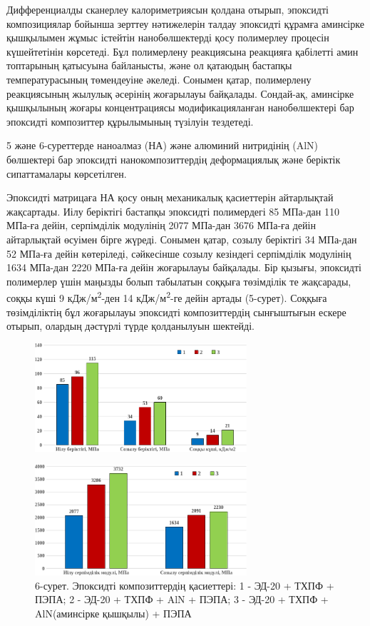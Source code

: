 \begin{multicols}{2}
Дифференциалды сканерлеу калориметриясын қолдана отырып, эпоксидті
композициялар бойынша зерттеу нәтижелерін талдау эпоксидті құрамға
аминсірке қышқылымен жұмыс істейтін нанобөлшектерді қосу полимерлеу
процесін күшейтетінін көрсетеді. Бұл полимерлену реакциясына реакцияға
қабілетті амин топтарының қатысуына байланысты, және ол қатаюдың
бастапқы температурасының төмендеуіне әкеледі. Сонымен қатар,
полимерлену реакциясының жылулық әсерінің жоғарылауы байқалады.
Сондай-ақ, аминсірке қышқылының жоғары концентрациясы модификацияланған
нанобөлшектері бар эпоксидті композиттер құрылымының түзілуін тездетеді.

5 және 6-суреттерде наноалмаз (НА) және алюминий нитридінің (AlN)
бөлшектері бар эпоксидті нанокомпозиттердің деформациялық және беріктік
сипаттамалары көрсетілген.

Эпоксидті матрицаға НА қосу оның механикалық қасиеттерін айтарлықтай
жақсартады. Иілу беріктігі бастапқы эпоксидті полимердегі 85 МПа-дан 110
МПа-ға дейін, серпімділік модулінің 2077 МПа-дан 3676 МПа-ға дейін
айтарлықтай өсуімен бірге жүреді. Сонымен қатар, созылу беріктігі 34
МПа-дан 52 МПа-ға дейін көтеріледі, сәйкесінше созылу кезіндегі
серпімділік модулінің 1634 МПа-дан 2220 МПа-ға дейін жоғарылауы
байқалады. Бір қызығы, эпоксидті полимерлер үшін маңызды болып табылатын
соққыға төзімділік те жақсарады, соққы күші 9
кДж/м\textsuperscript{2}-ден 14 кДж/м\textsuperscript{2}-ге дейін артады
(5-сурет). Соққыға төзімділіктің бұл жоғарылауы эпоксидті композиттердің
сынғыштығын ескере отырып, олардың дәстүрлі түрде қолданылуын шектейді.
\end{multicols}

\begin{figure}[H]
	\centering
	\includegraphics[width=0.7\textwidth]{media/chem/image111}
\end{figure}
\begin{figure}[H]
	\centering
	\includegraphics[width=0.7\textwidth]{media/chem/image112}
    \caption*{6-сурет. Эпоксидті композиттердің қасиеттері: 1 - ЭД-20 + ТХПФ +
ПЭПА; 2 - ЭД-20 + ТХПФ + AlN + ПЭПА; 3 - ЭД-20 + ТХПФ + AlN(аминсірке қышқылы) + ПЭПА}
\end{figure}

